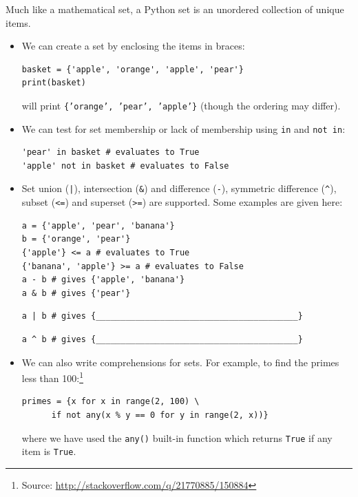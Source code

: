 \documentclass[a4paper,twoside,titlepage]{memoir}
\newcommand{\shellcmd}{\texttt}
\begin{document}
Much like a mathematical set, a Python set is an unordered collection of unique items.
\begin{itemize}
\item We can create a set by enclosing the items in braces:
\begin{verbatim}
basket = {'apple', 'orange', 'apple', 'pear'}
print(basket)
\end{verbatim}
will print \shellcmd{\{'orange', 'pear', 'apple'\}} (though the ordering may differ).
\item We can test for set membership or lack of membership using \shellcmd{in} and \shellcmd{not in}:
\begin{verbatim}
'pear' in basket # evaluates to True
'apple' not in basket # evaluates to False
\end{verbatim}

\item Set union (\shellcmd{|}), intersection (\shellcmd{\&}) and difference (\shellcmd{-}), symmetric difference (\shellcmd{\^}), subset (\shellcmd{<=}) and superset (\shellcmd{>=}) are supported.  Some examples are given here:
\begin{verbatim}
a = {'apple', 'pear', 'banana'}
b = {'orange', 'pear'}
{'apple'} <= a # evaluates to True
{'banana', 'apple'} >= a # evaluates to False
a - b # gives {'apple', 'banana'}
a & b # gives {'pear'}
\end{verbatim}
\begin{verbatim}
a | b # gives {_________________________________________}
\end{verbatim}
\begin{verbatim}
a ^ b # gives {_________________________________________}
\end{verbatim}

\item We can also write comprehensions for sets.  For example, to find the primes less than 100:\footnote{Source: \url{http://stackoverflow.com/q/21770885/150884}}
\begin{verbatim}
primes = {x for x in range(2, 100) \
	  if not any(x % y == 0 for y in range(2, x))}
\end{verbatim}
where we have used the \shellcmd{any()} built-in function which returns \shellcmd{True} if any item is \shellcmd{True}.
\end{itemize}
\end{document}
